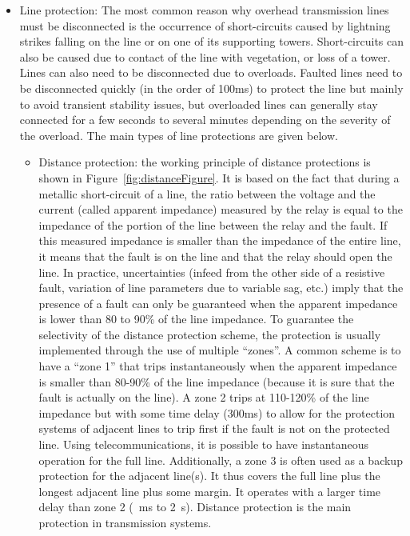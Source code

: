 \begin{itemize}
    \item Line protection: The most common reason why overhead transmission lines must be disconnected is the occurrence of short-circuits caused by lightning strikes falling on the line or on one of its supporting towers. Short-circuits can also be caused due to contact of the line with vegetation, or loss of a tower. Lines can also need to be disconnected due to overloads. Faulted lines need to be disconnected quickly (in the order of 100ms) to protect the line but mainly to avoid transient stability issues, but overloaded lines can generally stay connected for a few seconds to several minutes depending on the severity of the overload. The main types of line protections are given below.
    \begin{itemize}
        \item Distance protection: the working principle of distance protections is shown in Figure~\ref{fig:distanceFigure}. It is based on the fact that during a metallic short-circuit of a line, the ratio between the voltage and the current (called apparent impedance) measured by the relay is equal to the impedance of the portion of the line between the relay and the fault. If this measured impedance is smaller than the impedance of the entire line, it means that the fault is on the line and that the relay should open the line. In practice, uncertainties (infeed from the other side of a resistive fault, variation of line parameters due to variable sag, etc.) imply that the presence of a fault can only be guaranteed when the apparent impedance is lower than 80 to 90\% of the line impedance. To guarantee the selectivity of the distance protection scheme, the protection is usually implemented through the use of multiple ``zones''. A common scheme is to have a ``zone 1'' that trips instantaneously when the apparent impedance is smaller than 80-90\% of the line impedance (because it is sure that the fault is actually on the line). A zone 2 trips at 110-120\% of the line impedance but with some time delay (\eg 300ms) to allow for the protection systems of adjacent lines to trip first if the fault is not on the protected line. Using telecommunications, it is possible to have instantaneous operation for the full line. Additionally, a zone 3 is often used as a backup protection for the adjacent line(s). It thus covers the full line plus the longest adjacent line plus some margin. It operates with a larger time delay than zone 2 (~ms to 2~s). Distance protection is the main protection in transmission systems.

\end{itemize}
\end{itemize}
